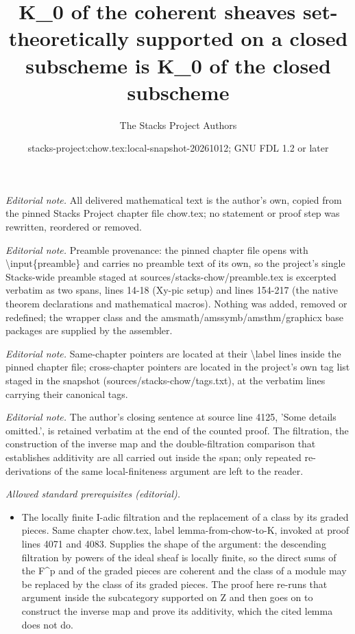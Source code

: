 \documentclass[10pt,a4paper]{amsart}
\title{K\_0 of the coherent sheaves set-theoretically supported on a closed subscheme is K\_0 of the closed subscheme}
\author{The Stacks Project Authors}
\date{stacks-project:chow.tex:local-snapshot-20261012; GNU FDL 1.2 or later}
\theoremstyle{plain}
\theoremstyle{definition}
\theoremstyle{remark}
\numberwithin{equation}{subsection}
\begin{document}
\maketitle
\noindent\textit{Editorial note.} All delivered mathematical text is the author's own, copied from the pinned Stacks Project chapter file chow.tex; no statement or proof step was rewritten, reordered or removed.\par\medskip
\noindent\textit{Editorial note.} Preamble provenance: the pinned chapter file opens with \textbackslash{}input\{preamble\} and carries no preamble text of its own, so the project's single Stacks-wide preamble staged at sources/stacks-chow/preamble.tex is excerpted verbatim as two spans, lines 14-18 (Xy-pic setup) and lines 154-217 (the native theorem declarations and mathematical macros). Nothing was added, removed or redefined; the wrapper class and the amsmath/amssymb/amsthm/graphicx base packages are supplied by the assembler.\par\medskip
\noindent\textit{Editorial note.} Same-chapter pointers are located at their \textbackslash{}label lines inside the pinned chapter file; cross-chapter pointers are located in the project's own tag list staged in the snapshot (sources/stacks-chow/tags.txt), at the verbatim lines carrying their canonical tags.\par\medskip
\noindent\textit{Editorial note.} The author's closing sentence at source line 4125, 'Some details omitted.', is retained verbatim at the end of the counted proof. The filtration, the construction of the inverse map and the double-filtration comparison that establishes additivity are all carried out inside the span; only repeated re-derivations of the same local-finiteness argument are left to the reader.\par\medskip
\noindent\textit{Allowed standard prerequisites (editorial).}\begin{itemize}
\item The locally finite I-adic filtration and the replacement of a class by its graded pieces. Same chapter chow.tex, label lemma-from-chow-to-K, invoked at proof lines 4071 and 4083. Supplies the shape of the argument: the descending filtration by powers of the ideal sheaf is locally finite, so the direct sums of the F\textasciicircum{}p and of the graded pieces are coherent and the class of a module may be replaced by the class of its graded pieces. The proof here re-runs that argument inside the subcategory supported on Z and then goes on to construct the inverse map and prove its additivity, which the cited lemma does not do.
\end{itemize}\medskip
\end{document}
